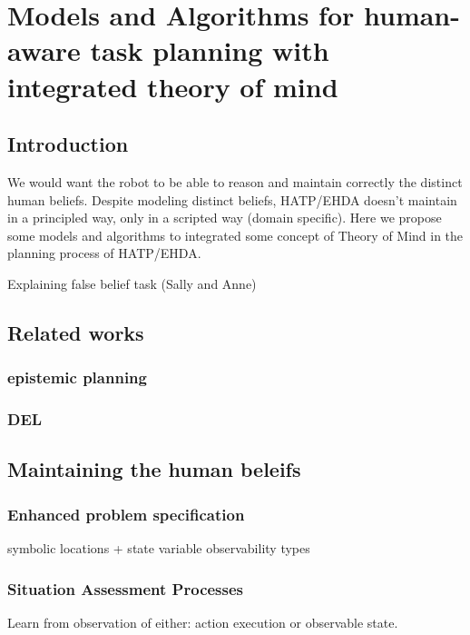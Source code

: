 \ifdefined{}
\else
\setcounter{chapter}{2} %
\dominitoc
\faketableofcontents
\fi

\chapter{Models and Algorithms for human-aware task planning with integrated theory of mind}
\label{chap:3}
\minitoc


\section{Introduction}

We would want the robot to be able to reason and maintain correctly the distinct human beliefs. Despite modeling distinct beliefs, HATP/EHDA doesn't maintain in a principled way, only in a scripted way (domain specific). Here we propose some models and algorithms to integrated some concept of Theory of Mind in the planning process of HATP/EHDA. 

Explaining false belief task (Sally and Anne)

\section{Related works}
\subsection{epistemic planning}
\subsection{DEL}

\section{Maintaining the human beleifs}

\subsection{Enhanced problem specification}
symbolic locations + state variable observability types

\subsection{Situation Assessment Processes}
Learn from observation of either: action execution or observable state.

